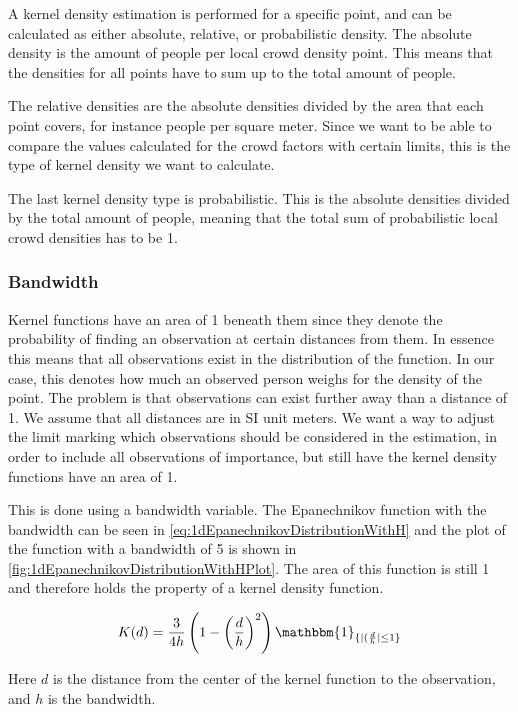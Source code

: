 A kernel density estimation is performed for a specific point, and can be calculated as either absolute, relative, or probabilistic density. The absolute density is the amount of people per local crowd density point. This means that the densities for all points have to sum up to the total amount of people.

The relative densities are the absolute densities divided by the area that each point covers, for instance people per square meter. Since we want to be able to compare the values calculated for the crowd factors with certain limits, this is the type of kernel density we want to calculate.

The last kernel density type is probabilistic. This is the absolute densities divided by the total amount of people, meaning that the total sum of probabilistic local crowd densities has to be 1.

\subsubsection{Bandwidth}

Kernel functions have an area of 1 beneath them since they denote the probability of finding an observation at certain distances from them. In essence this means that all observations exist in the distribution of the function. In our case, this denotes how much an observed person weighs for the density of the point. The problem is that observations can exist further away than a distance of 1. We assume that all distances are in SI unit meters. We want a way to adjust the limit marking which observations should be considered in the estimation, in order to include all observations of importance, but still have the kernel density functions have an area of 1. 

This is done using a bandwidth variable. The Epanechnikov function with the bandwidth can be seen in \cref{eq:1dEpanechnikovDistributionWithH} and the plot of the function with a bandwidth of 5 is shown in \cref{fig:1dEpanechnikovDistributionWithHPlot}. The area of this function is still 1 and therefore holds the property of a kernel density function.

\begin{equation}
\label{eq:1dEpanechnikovDistributionWithH}
K(d) = \frac{3}{4 h} \left( 1-\left(\frac{d}{h}\right)^2 \right) \mathbbm{1}_{\{|(\frac{d}{h}| \leq 1\}}
\end{equation}

Here $d$ is the distance from the center of the kernel function to the observation, and $h$ is the bandwidth.

